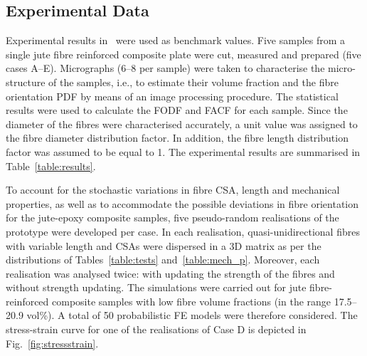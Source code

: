 
\subsection{Experimental Data}

	Experimental results in~\autocite{Virk.2013} were used as benchmark values. Five samples from a single jute fibre reinforced composite plate were cut, measured and prepared (five cases A--E). Micrographs (6--8 per sample) were taken to characterise the micro-structure of the samples, i.e., to estimate their volume fraction and the fibre orientation PDF by means of an image processing procedure. The statistical results were used to calculate the FODF and FACF for each sample. Since the diameter of the fibres were characterised accurately, a unit value was assigned to the fibre diameter distribution factor. In addition, the fibre length distribution factor was assumed to be equal to 1. The experimental results are summarised in Table~\ref{table:results}.



	To account for the stochastic variations in fibre CSA, length and mechanical properties, as well as to accommodate the possible deviations in fibre orientation for the jute-epoxy composite samples, five pseudo-random realisations of the prototype were developed per case.  In each realisation, quasi-unidirectional fibres with variable length and CSAs were dispersed in a 3D matrix as per the distributions of Tables~\ref{table:tests} and~\ref{table:mech_p}. Moreover, each realisation was analysed twice: with updating the strength of the fibres and without strength updating. The simulations were carried out for jute fibre-reinforced composite samples with low fibre volume fractions (in the range 17.5--20.9 vol\%). A total of 50 probabilistic FE models were therefore considered. The stress-strain curve for one of the realisations of Case D is depicted in Fig.~\ref{fig:stressstrain}.

